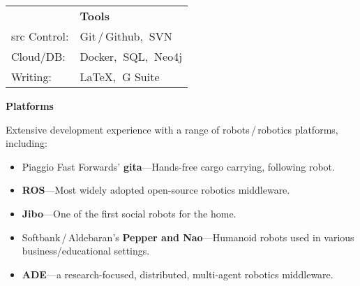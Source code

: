 \documentclass[10pt, letter]{article}
\newcommand{\years}[1]{\marginnote{\footnotesize #1}}
\newcommand{\skill}[1]{\footnotesize #1}
\begin{document}
\vspace{-2.15cm}
\begin{minipage}[hr]{0.8\textwidth}
  \flushright
  \begin{tabular}[h]{ll}
    \vspace{0.125cm}
    & \textbf{\fontsize{10.5pt}{1em}\selectfont Tools}\\
    \skill{src Control:} & Git\,/\,Github,$\:$ SVN\\
    \skill{Cloud/DB:}    & Docker,$\:$ SQL,$\:$ Neo4j\\
    \skill{Writing:}     & \LaTeX,$\:$ G Suite\\
  \end{tabular}
\end{minipage}

\vspace{0.5cm}
\textbf{\fontsize{10.5pt}{1em}\selectfont Platforms} \bigskip

\vspace{-0.3cm}
\years{Robotics:}
Extensive development experience with a range of robots\,/\,robotics platforms, including:
\begin{itemize}[leftmargin=*, parsep=-1pt]
\item Piaggio Fast Forwards' \textbf{gita}---Hands-free cargo carrying, following robot.
\item \textbf{ROS}---Most widely adopted open-source robotics middleware.
\item \textbf{Jibo}---One of the first social robots for the home.
\item Softbank\,/\,Aldebaran's \textbf{Pepper and Nao}---Humanoid robots used in various business/educational settings.  
\item \textbf{ADE}---a research-focused, distributed, multi-agent robotics middleware.
\end{itemize}


\end{document}
